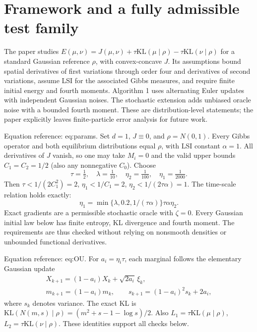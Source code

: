 \documentclass[10pt]{article}
\begin{document}
\section*{Framework and a fully admissible test family}
The paper studies \(E(\mu,\nu)=J(\mu,\nu)+\tau\mathrm{KL}(\mu\mid\rho)-
\tau\mathrm{KL}(\nu\mid\rho)\) for a standard Gaussian reference \(\rho\), with convex-concave \(J\). Its assumptions bound spatial derivatives of first variations through order four and derivatives of second variations, assume LSI for the associated Gibbs measures, and require finite initial energy and fourth moments. Algorithm 1 uses alternating Euler updates with independent Gaussian noises. The stochastic extension adds unbiased oracle noise with a bounded fourth moment. These are distribution-level statements; the paper explicitly leaves finite-particle error analysis for future work.\par
Equation reference: eq:params. Set \(d=1\), \(J\equiv0\), and \(\rho=N(0,1)\). Every Gibbs operator and both equilibrium distributions equal \(\rho\), with LSI constant \(\alpha=1\). All derivatives of \(J\) vanish, so one may take \(M_i=0\) and the valid upper bounds \(C_1=C_2=1/2\) (also any nonnegative \(C_0\)). Choose \[
 \tau=\tfrac12,\quad\lambda=\tfrac1{10},\quad
 \eta_2=\tfrac1{100},\quad\eta_1=\tfrac1{2000}.\] Then \(\tau<1/(2C_1^2)=2\), \(\eta_1<1/C_1=2\), \(\eta_2<1/(2\tau\alpha)=1\). The time-scale relation holds exactly: \[\eta_1=\min\{\lambda,0.2,1/(\tau\alpha)\}\tau\alpha\eta_2.\] Exact gradients are a permissible stochastic oracle with \(\zeta=0\). Every Gaussian initial law below has finite entropy, KL divergence and fourth moment. The requirements are thus checked without relying on nonsmooth densities or unbounded functional derivatives.\par
Equation reference: eq:OU. For \(a_i=\eta_i\tau\), each marginal follows the elementary Gaussian update \[
 \begin{gathered}
 X_{k+1}=(1-a_i)X_k+\sqrt{2a_i}\,\xi_k,\\
 m_{k+1}=(1-a_i)m_k,\qquad s_{k+1}=(1-a_i)^2s_k+2a_i,
 \end{gathered}\] where \(s_k\) denotes variance. The exact KL is \(\mathrm{KL}(N(m,s)\mid\rho)=(m^2+s-1-\log s)/2\). Also \(L_1=\tau\mathrm{KL}(\mu\mid\rho)\), \(L_2=\tau\mathrm{KL}(\nu\mid\rho)\). These identities support all checks below.\par
\end{document}
